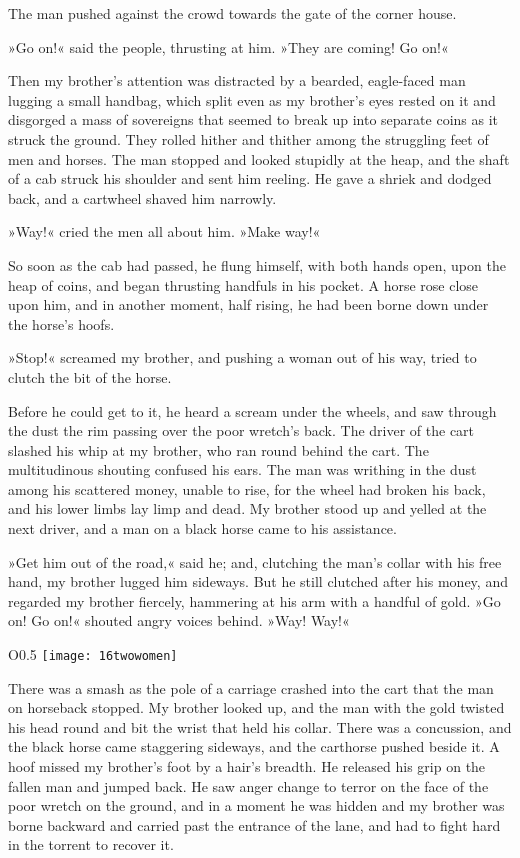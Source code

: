 The man pushed against the crowd towards the gate of the corner house.

»Go on!« said the people, thrusting at him. »They are coming! Go on!«

Then my brother's attention was distracted by a bearded, eagle-faced man lugging a small handbag, which split even as my brother's eyes rested on it and disgorged a mass of sovereigns that seemed to break up into separate coins as it struck the ground. They rolled hither and thither among the struggling feet of men and horses. The man stopped and looked stupidly at the heap, and the shaft of a cab struck his shoulder and sent him reeling. He gave a shriek and dodged back, and a cartwheel shaved him narrowly.

»Way!« cried the men all about him. »Make way!«

So soon as the cab had passed, he flung himself, with both hands open, upon the heap of coins, and began thrusting handfuls in his pocket. A horse rose close upon him, and in another moment, half rising, he had been borne down under the horse's hoofs.

»Stop!« screamed my brother, and pushing a woman out of his way, tried to clutch the bit of the horse.

Before he could get to it, he heard a scream under the wheels, and saw through the dust the rim passing over the poor wretch's back. The driver of the cart slashed his whip at my brother, who ran round behind the cart. The multitudinous shouting confused his ears. The man was writhing in the dust among his scattered money, unable to rise, for the wheel had broken his back, and his lower limbs lay limp and dead. My brother stood up and yelled at the next driver, and a man on a black horse came to his assistance.

»Get him out of the road,« said he; and, clutching the man's collar with his free hand, my brother lugged him sideways. But he still clutched after his money, and regarded my brother fiercely, hammering at his arm with a handful of gold. »Go on! Go on!« shouted angry voices behind. »Way! Way!«

\begin{letter}
	\begin{wrapfigure}{O}{0.5\textwidth}
		\centering
		\texttt{[image: 16twowomen]}
	\end{wrapfigure}
\end{letter}

There was a smash as the pole of a carriage crashed into the cart that the man on horseback stopped. My brother looked up, and the man with the gold twisted his head round and bit the wrist that held his collar. There was a concussion, and the black horse came staggering sideways, and the carthorse pushed beside it. A hoof missed my brother's foot by a hair's breadth. He released his grip on the fallen man and jumped back. He saw anger change to terror on the face of the poor wretch on the ground, and in a moment he was hidden and my brother was borne backward and carried past the entrance of the lane, and had to fight hard in the torrent to recover it.



